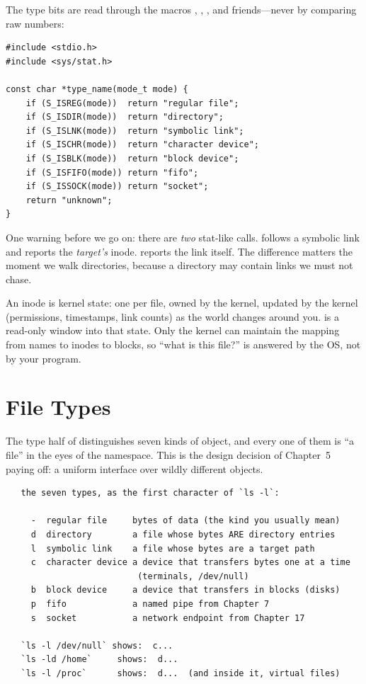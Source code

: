 The type bits are read through the macros ,
, , and friends---never by comparing raw
numbers:

\begin{lstlisting}[caption={The S\_IS* macros decode the type half of st\_mode.}]
#include <stdio.h>
#include <sys/stat.h>

const char *type_name(mode_t mode) {
    if (S_ISREG(mode))  return "regular file";
    if (S_ISDIR(mode))  return "directory";
    if (S_ISLNK(mode))  return "symbolic link";
    if (S_ISCHR(mode))  return "character device";
    if (S_ISBLK(mode))  return "block device";
    if (S_ISFIFO(mode)) return "fifo";
    if (S_ISSOCK(mode)) return "socket";
    return "unknown";
}
\end{lstlisting}

One warning before we go on: there are \emph{two} stat-like calls.
 follows a symbolic link and reports the
\emph{target's} inode.  reports the link itself.
The difference matters the moment we walk directories, because a
directory may contain links we must not chase.

\begin{osconcept}
An inode is kernel state: one per file, owned by the kernel, updated
by the kernel (permissions, timestamps, link counts) as the world
changes around you.  is a read-only window into that state.
Only the kernel can maintain the mapping from names to inodes to
blocks, so ``what is this file?'' is answered by the OS, not by your
program.
\end{osconcept}

\section{File Types}

The type half of  distinguishes seven kinds of object,
and every one of them is ``a file'' in the eyes of the namespace.
This is the design decision of Chapter~5 paying off: a uniform
interface over wildly different objects.

\begin{verbatim}
   the seven types, as the first character of `ls -l`:

     -  regular file     bytes of data (the kind you usually mean)
     d  directory        a file whose bytes ARE directory entries
     l  symbolic link    a file whose bytes are a target path
     c  character device a device that transfers bytes one at a time
                          (terminals, /dev/null)
     b  block device     a device that transfers in blocks (disks)
     p  fifo             a named pipe from Chapter 7
     s  socket           a network endpoint from Chapter 17

   `ls -l /dev/null` shows:  c...
   `ls -ld /home`     shows:  d...
   `ls -l /proc`      shows:  d...  (and inside it, virtual files)
\end{verbatim}

